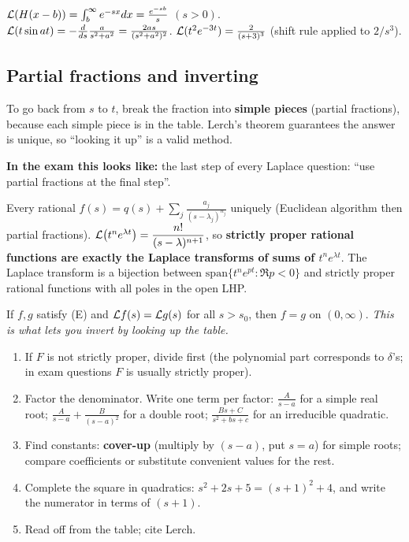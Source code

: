 \begin{workbox}[title={Worked example: Heaviside function \fr{90} and the $t$-rule}]
$\mathcal{L}(H(x-b))=\int_b^\infty e^{-sx}dx=\frac{e^{-sb}}{s}$ $(s>0)$.\\
$\mathcal{L}(t\sin at)=-\frac{d}{ds}\frac{a}{s^2+a^2}=\frac{2as}{(s^2+a^2)^2}$. \quad $\mathcal{L}(t^2e^{-3t})=\frac{2}{(s+3)^3}$ (shift rule applied to $2/s^3$).
\end{workbox}

\subsection{Partial fractions and inverting \texorpdfstring{}{}}\label{ss:3-4}
\begin{plainbox}
To go back from $s$ to $t$, break the fraction into \textbf{simple pieces} (partial fractions), because each simple piece is in the table.
Lerch's theorem guarantees the answer is unique, so ``looking it up'' is a valid method.
\par\smallskip\textbf{In the exam this looks like:} the last step of every Laplace question: ``use partial fractions at the final step''.
\end{plainbox}
\begin{thmbox}[title={Prop 0.35, Cor 0.36, Cor 0.37}]
Every rational $f(s)=q(s)+\sum_j\frac{a_j}{(s-\lambda_j)^{n_j}}$ uniquely (Euclidean algorithm then partial fractions).
$\mathcal{L}\big(t^ne^{\lambda t}\big)=\dfrac{n!}{(s-\lambda)^{n+1}}$, so \textbf{strictly proper rational functions are exactly the Laplace transforms of sums of $t^ne^{\lambda t}$}.
The Laplace transform is a bijection between $\mathrm{span}\{t^ne^{pt}:\Re p<0\}$ and strictly proper rational functions with all poles in the open LHP.
\end{thmbox}
\begin{thmbox}[title={Theorem 0.29 (Lerch's uniqueness)}]
If $f,g$ satisfy (E) and $\mathcal{L} f(s)=\mathcal{L} g(s)$ for all $s>s_0$, then $f=g$ on $(0,\infty)$. \emph{This is what lets you invert by looking up the table.}
\end{thmbox}
\begin{methodbox}[title={Method: invert $F(s)$}]
\begin{enumerate}
\item If $F$ is not strictly proper, divide first (the polynomial part corresponds to $\delta$'s; in exam questions $F$ is usually strictly proper).
\item Factor the denominator. Write one term per factor: $\frac{A}{s-a}$ for a simple real root;
$\frac{A}{s-a}+\frac{B}{(s-a)^2}$ for a double root; $\frac{Bs+C}{s^2+bs+c}$ for an irreducible quadratic.
\item Find constants: \textbf{cover-up} (multiply by $(s-a)$, put $s=a$) for simple roots; compare coefficients or substitute convenient values for the rest.
\item Complete the square in quadratics: $s^2+2s+5=(s+1)^2+4$, and write the numerator in terms of $(s+1)$.
\item Read off from the table; cite Lerch.
\end{enumerate}
\end{methodbox}

